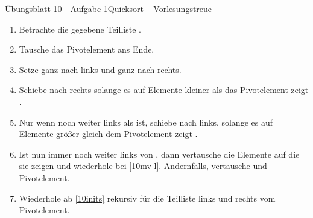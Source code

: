 \begin{frame}[c]{Übungsblatt 10 - Aufgabe 1\hfill Quicksort -- Vorlesungstreue}
    \small\begin{enumerate}[<+(1)->]
        \item\label{10inits} Betrachte die gegebene Teilliste .
        \item Tausche das Pivotelement ans Ende.
        \item Setze  ganz nach links und  ganz nach rechts. 
        \item \label{10mv-l}Schiebe  nach rechts solange es auf Elemente kleiner als das Pivotelement zeigt .
        \item Nur wenn  noch weiter links als  ist, schiebe  nach links, solange es auf Elemente größer gleich dem Pivotelement zeigt .
        \item Ist  nun immer noch weiter links von , dann vertausche die Elemente auf die sie zeigen und wiederhole bei \ref{10mv-l}. Andernfalls, vertausche  und Pivotelement.
        \item Wiederhole ab \ref{10inits} rekursiv für die Teilliste links und rechts vom Pivotelement.
    \end{enumerate}
    \begin{center}
    \end{center}
\end{frame}


